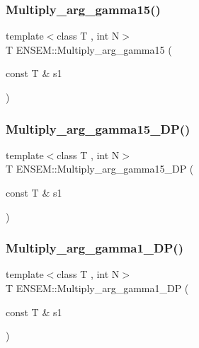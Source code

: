 \mbox{\label{namespaceENSEM_ad1bfb7d1fc1c7b777e7e1d92accbc1b7}} 
\subsubsection{\texorpdfstring{Multiply\_arg\_gamma15()}{Multiply\_arg\_gamma15()}}
{\footnotesize\ttfamily template$<$class T , int N$>$ \\
T E\+N\+S\+E\+M\+::\+Multiply\+\_\+arg\+\_\+gamma15 (\begin{DoxyParamCaption}\item[{const T \&}]{s1 }\end{DoxyParamCaption})\hspace{0.3cm}{\ttfamily [inline]}}

\mbox{\label{namespaceENSEM_ab24a3a41aeb943ec71c06de029e9540b}} 
\subsubsection{\texorpdfstring{Multiply\_arg\_gamma15\_DP()}{Multiply\_arg\_gamma15\_DP()}}
{\footnotesize\ttfamily template$<$class T , int N$>$ \\
T E\+N\+S\+E\+M\+::\+Multiply\+\_\+arg\+\_\+gamma15\+\_\+\+DP (\begin{DoxyParamCaption}\item[{const T \&}]{s1 }\end{DoxyParamCaption})\hspace{0.3cm}{\ttfamily [inline]}}

\mbox{\label{namespaceENSEM_abafa173ea01d6b8ed3f4a6053171d931}} 
\subsubsection{\texorpdfstring{Multiply\_arg\_gamma1\_DP()}{Multiply\_arg\_gamma1\_DP()}}
{\footnotesize\ttfamily template$<$class T , int N$>$ \\
T E\+N\+S\+E\+M\+::\+Multiply\+\_\+arg\+\_\+gamma1\+\_\+\+DP (\begin{DoxyParamCaption}\item[{const T \&}]{s1 }\end{DoxyParamCaption})\hspace{0.3cm}{\ttfamily [inline]}}

